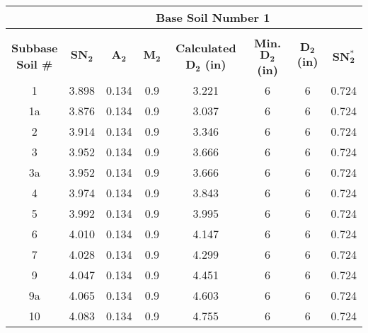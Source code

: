 \documentclass{article}
\begin{document}
\begin{center}
    \begin{spacing}{1.6}



        \begin{tabular}{|c|ccccccc|}
            \hline    
            \multicolumn{1}{|l}{}                     & \multicolumn{7}{c|}{\textbf{Base Soil Number 1}}                                              \\\hline
            &&&&&&&\\
             \shortstack[c]{\textbf{Subbase}\\\textbf{Soil \#}} & $\bm{SN_2}$ & $\bm{A_2}$ & $\bm{M_2}$ & \textbf{Calculated $\bm{D_2}$ (in)} & \textbf{Min. $\bm{D_2}$ (in)} & \textbf{$\bm{D_2}$ (in)} & $\bm{SN_2^*}$  \\\hline
                                            1  & 3.898 & 0.134 & 0.9 & 3.221 & 6 & 6 & 0.724  \\
                                            1a & 3.876 & 0.134 & 0.9 & 3.037 & 6 & 6 & 0.724  \\
                                            2  & 3.914 & 0.134 & 0.9 & 3.346 & 6 & 6 & 0.724  \\
                                            3  & 3.952 & 0.134 & 0.9 & 3.666 & 6 & 6 & 0.724  \\
                                            3a & 3.952 & 0.134 & 0.9 & 3.666 & 6 & 6 & 0.724  \\
                                            4  & 3.974 & 0.134 & 0.9 & 3.843 & 6 & 6 & 0.724  \\
                                            5  & 3.992 & 0.134 & 0.9 & 3.995 & 6 & 6 & 0.724  \\
                                            6  & 4.010 & 0.134 & 0.9 & 4.147 & 6 & 6 & 0.724  \\
                                            7  & 4.028 & 0.134 & 0.9 & 4.299 & 6 & 6 & 0.724  \\
                                            9  & 4.047 & 0.134 & 0.9 & 4.451 & 6 & 6 & 0.724  \\
                                            9a & 4.065 & 0.134 & 0.9 & 4.603 & 6 & 6 & 0.724  \\
                                            10 & 4.083 & 0.134 & 0.9 & 4.755 & 6 & 6 & 0.724 \\\hline
        \end{tabular}

\end{spacing}
\end{center}
\end{document}
